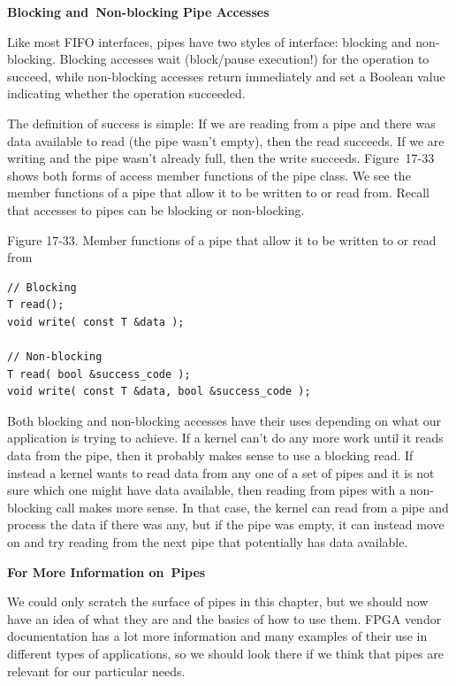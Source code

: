 \hspace*{\fill} \par %
\textbf{Blocking and Non-blocking Pipe Accesses}

Like most FIFO interfaces, pipes have two styles of interface: blocking and non-blocking. Blocking accesses wait (block/pause execution!) for the operation to succeed, while non-blocking accesses return immediately and set a Boolean value indicating whether the operation succeeded.\par

The definition of success is simple: If we are reading from a pipe and there was data available to read (the pipe wasn’t empty), then the read succeeds. If we are writing and the pipe wasn’t already full, then the write succeeds. Figure 17-33 shows both forms of access member functions of the pipe class. We see the member functions of a pipe that allow it to be written to or read from. Recall that accesses to pipes can be blocking or non-blocking.\par

\hspace*{\fill} \par %
Figure 17-33. Member functions of a pipe that allow it to be written to or read from
\begin{lstlisting}[caption={}]
// Blocking
T read();
void write( const T &data );

// Non-blocking
T read( bool &success_code );
void write( const T &data, bool &success_code ); 
\end{lstlisting}

Both blocking and non-blocking accesses have their uses depending on what our application is trying to achieve. If a kernel can’t do any more work until it reads data from the pipe, then it probably makes sense to use a blocking read. If instead a kernel wants to read data from any one of a set of pipes and it is not sure which one might have data available, then reading from pipes with a non-blocking call makes more sense. In that case, the kernel can read from a pipe and process the data if there was any, but if the pipe was empty, it can instead move on and try reading from the next pipe that potentially has data available.\par

\hspace*{\fill} \par %
\textbf{For More Information on Pipes}

We could only scratch the surface of pipes in this chapter, but we should now have an idea of what they are and the basics of how to use them. FPGA vendor documentation has a lot more information and many examples of their use in different types of applications, so we should look there if we think that pipes are relevant for our particular needs.\par

